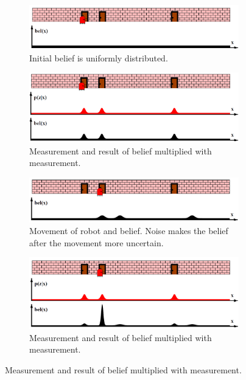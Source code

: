 \begin{figure}[H]
\centering

\begin{subfigure}[b]{.8\textwidth}
  \centering
  \includegraphics[width=1\linewidth]{billeder/MarkovLocalisation01.png}
  \caption{Initial belief is uniformly distributed.}
  \label{ML_fig1:sub1}
\end{subfigure}%

\begin{subfigure}[b]{.8\textwidth}
  \centering
  \includegraphics[width=1\linewidth]{billeder/MarkovLocalisation02.png}
  \caption{Measurement and result of belief multiplied with measurement.}
  \label{ML_fig1:sub2}
\end{subfigure}

\begin{subfigure}[b]{.8\textwidth}
  \centering
  \includegraphics[width=1\linewidth]{billeder/MarkovLocalisation03.png}
  \caption{Movement of robot and belief. Noise makes the belief after the movement more uncertain.}
  \label{ML_fig1:sub3}
\end{subfigure}%

\begin{subfigure}[b]{.8\textwidth}
  \centering
  \includegraphics[width=1\linewidth]{billeder/MarkovLocalisation04.png}
  \caption{Measurement and result of belief multiplied with measurement.}
  \label{ML_fig1:sub4}
\end{subfigure}


\end{figure}
